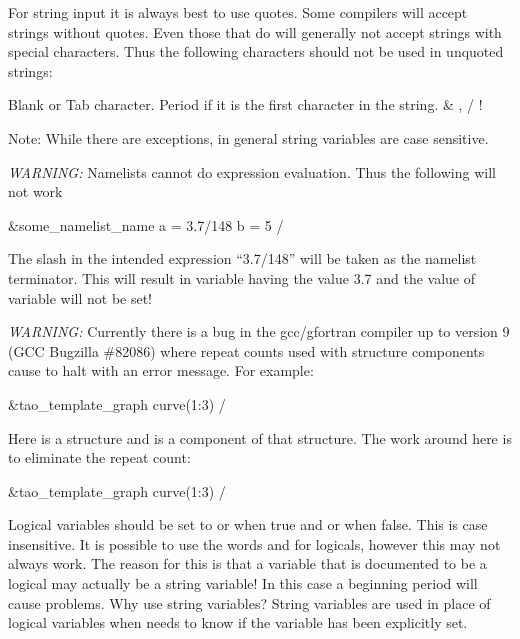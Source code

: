 For string input it is always best to use quotes. Some compilers will accept strings without
quotes. Even those that do will generally not accept strings with special characters.  Thus the
following characters should not be used in unquoted strings:
\begin{example}
  Blank or Tab character.
  Period if it is the first character in the string.
  &   ,   /    !   %
\end{example}
Note: While there are exceptions, in general \tao string variables are
case sensitive.

{\em WARNING:} Namelists cannot do expression evaluation. Thus the following will not work
\begin{example}
  &some_namelist_name
    a = 3.7/148
    b = 5
  /
\end{example}
The slash in the intended expression ``3.7/148'' will be taken as the namelist terminator. This
will result in variable  having the value 3.7 and the value of variable  will not
be set!

{\em WARNING:} Currently there is a bug in the gcc/gfortran compiler up to version 9 (GCC Bugzilla
\#82086) where repeat counts used with structure components cause \tao to halt with an error
message. For example:
\begin{example}
  &tao_template_graph
    curve(1:3)%
  /
\end{example}
Here  is a structure and  is a component of that structure. The
work around here is to eliminate the repeat count:
\begin{example}
  &tao_template_graph
    curve(1:3)%
  /
\end{example}

Logical variables should be set to  or  when true and  or  when
false. This is case insensitive. It is possible to use the words  and  for
logicals, however this may not always work. The reason for this is that a variable that is
documented to be a logical may actually be a string variable! In this case a beginning period will
cause problems. Why use string variables? String variables are used in place of logical variables
when \tao needs to know if the variable has been explicitly set.

